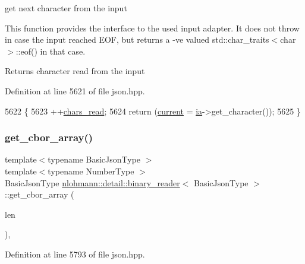 get next character from the input 

This function provides the interface to the used input adapter. It does not throw in case the input reached E\+OF, but returns a -\/\textquotesingle{}ve valued {\ttfamily std\+::char\+\_\+traits$<$char$>$\+::eof()} in that case.

\begin{DoxyReturn}{Returns}
character read from the input 
\end{DoxyReturn}


Definition at line 5621 of file json.\+hpp.


\begin{DoxyCode}
5622     \{
5623         ++\hyperlink{classnlohmann_1_1detail_1_1binary__reader_a2dbde0b7390100efe0bfc54e21c3a34b}{chars\_read};
5624         \textcolor{keywordflow}{return} (\hyperlink{classnlohmann_1_1detail_1_1binary__reader_a7e994e201b215cd6d6ae28a1853f43e0}{current} = \hyperlink{classnlohmann_1_1detail_1_1binary__reader_adae482b45b2bb733cad3efce034a8b71}{ia}->get\_character());
5625     \}
\end{DoxyCode}
\mbox{\label{classnlohmann_1_1detail_1_1binary__reader_a3ee69f0eabc2325477dd00689a00449b}} 
\subsubsection{\texorpdfstring{get\+\_\+cbor\+\_\+array()}{get\_cbor\_array()}}
{\footnotesize\ttfamily template$<$typename Basic\+Json\+Type $>$ \\
template$<$typename Number\+Type $>$ \\
Basic\+Json\+Type \hyperlink{classnlohmann_1_1detail_1_1binary__reader}{nlohmann\+::detail\+::binary\+\_\+reader}$<$ Basic\+Json\+Type $>$\+::get\+\_\+cbor\+\_\+array (\begin{DoxyParamCaption}\item[{const Number\+Type}]{len }\end{DoxyParamCaption})\hspace{0.3cm}{\ttfamily [inline]}, {\ttfamily [private]}}



Definition at line 5793 of file json.\+hpp.



